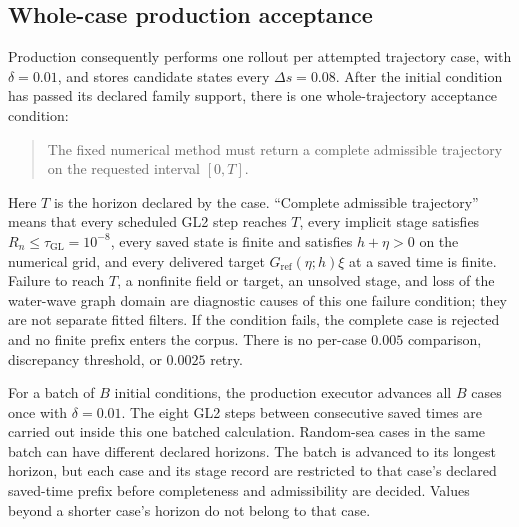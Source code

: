 \documentclass[11pt]{article}
\begin{document}
\subsection{Whole-case production acceptance}

Production consequently performs one rollout per attempted trajectory case,
with $\delta=0.01$, and stores candidate states every $\Delta s=0.08$.
After the initial condition has passed its declared family support, there is
one whole-trajectory acceptance condition:
\begin{quote}
The fixed numerical method must return a complete admissible trajectory on
the requested interval $[0,T]$.
\end{quote}
Here $T$ is the horizon declared by the case.  ``Complete admissible
trajectory'' means that every scheduled GL2 step reaches $T$, every implicit
stage satisfies $R_n\leq\tau_{\mathrm{GL}}=10^{-8}$, every saved state is
finite and satisfies $h+\eta>0$ on the numerical grid, and every delivered
target $G_{\mathrm{ref}}(\eta;h)\xi$ at a saved time is finite.  Failure to
reach $T$, a nonfinite field or target, an unsolved stage, and loss of the
water-wave graph domain are diagnostic causes of this one failure condition;
they are not separate fitted filters.  If the condition fails, the complete
case is rejected and no finite prefix enters the corpus.  There is no
per-case $0.005$ comparison, discrepancy threshold, or $0.0025$ retry.

For a batch of $B$ initial conditions, the production executor advances all
$B$ cases once with $\delta=0.01$.  The eight GL2 steps between consecutive
saved times are carried out inside this one batched calculation.  Random-sea
cases in the same batch can have different declared horizons.  The batch is
advanced to its longest horizon, but each case and its stage record are
restricted to that case's declared saved-time prefix before completeness and
admissibility are decided.  Values beyond a shorter case's horizon do not
belong to that case.
\end{document}
